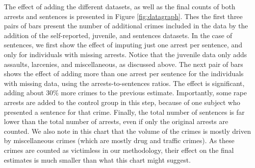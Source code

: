 \noindent The effect of adding the different datasets, as well as the final counts of both arrests and sentences is presented in Figure \ref{fig:datagraph}. Thes the first three pairs of bars present the number of additional crimes included in the data by the addition of the self-reported, juvenile, and sentences datasets. In the case of sentences, we first show the effect of imputing just one arrest per sentence, and only for individuals with missing arrests. Notice that the juvenile data only adds assaults, larcenies, and miscellaneous, as discussed above. The next pair of bars shows the effect of adding more than one arrest per sentence for the individuals with missing data, using the arrests-to-sentences ratios. The effect is significant, adding about 30\% more crimes to the previous estimate. Importantly, some rape arrests are added to the control group in this step, because of one subject who presented a sentence for that crime. Finally, the total number of sentences is far lower than the total number of arrests, even if only the original arrests are counted. We also note in this chart that the volume of the crimes is mostly driven by miscellaneous crimes (which are mostly drug and traffic crimes). As these crimes are counted as victimless in our methodology, their effect on the final estimates is much smaller than what this chart might suggest. \\

